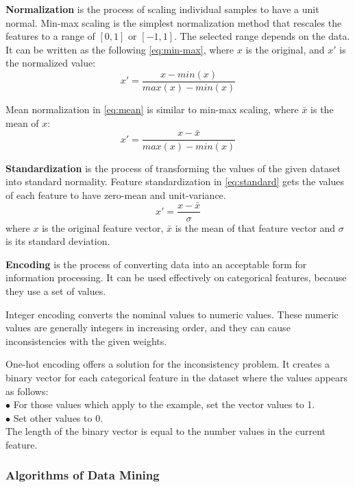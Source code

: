 \textbf{Normalization} is the process of scaling individual samples to have a unit normal. Min-max scaling is the simplest normalization method that rescales the features to a range of $[0, 1]$ or $[-1, 1]$. The selected range depends on the data. It can be written as the following \autoref{eq:min-max}, where $x$ is the original, and $x'$ is the normalized value:
\begin{equation} x' = \frac{x-min(x)}{max(x)-min(x)} \label{eq:min-max} \end{equation} 

\smallskip \noindent Mean normalization in \autoref{eq:mean} is similar to min-max scaling, where $\bar x$ is the mean of $x$:
\begin{equation} x' = \frac{x-\bar x}{max(x)-min(x)} \label{eq:mean} \end{equation} \medskip

\textbf{Standardization} is the process of transforming the values of the given dataset into standard normality. Feature standardization in \autoref{eq:standard} gets the values of each feature to have zero-mean and unit-variance. 
\begin{equation}  x'= \frac{x-\bar x}{\sigma} \label{eq:standard} \end{equation}
where $x$ is the original feature vector, $\bar x$ is the mean of that feature vector and $\sigma$ is its standard deviation.\bigskip

\textbf{Encoding} is the process of converting data into an acceptable form for information processing. It can be used effectively on categorical features, because they use a set of values. \smallskip

Integer encoding converts the nominal values to numeric values. These numeric values are generally integers in increasing order, and they can cause inconsistencies with the given weights.\smallskip

One-hot encoding offers a solution for the inconsistency problem. It creates a binary vector for each categorical feature in the dataset where the values appears as follows:\\
$\bullet$ For those values which apply to the example, set the vector values to 1.\\
$\bullet$ Set other values to 0.\\
The length of the binary vector is equal to the number values in the current feature.


\subsubsection{Algorithms of Data Mining}


